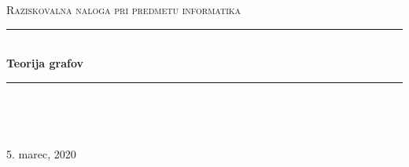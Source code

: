 \documentclass[11pt]{article}
\begin{document}
\begin{titlepage}
	\newcommand{\HRule}{\rule{\linewidth}{0.5mm}} %
	
	\center %
	
	\null\vspace{4cm} %
	
	
	\textsc{\Large Raziskovalna naloga pri predmetu informatika}\\[0.5cm] %
	
	\HRule\\[0.4cm]
	
	{\huge\bfseries Teorija grafov}\\[0.4cm] %
	
	\HRule\\[1.5cm]
	
	\begin{minipage}{0.4\textwidth}
		\begin{flushleft}
			\large
		\end{flushleft}
	\end{minipage}
	~
	\begin{minipage}{0.4\textwidth}
		\begin{flushright}
			\large
		\end{flushright}
	\end{minipage}
	
	\vfill
	
	{\large 5. marec, 2020}
	
\end{titlepage}
\end{document}
